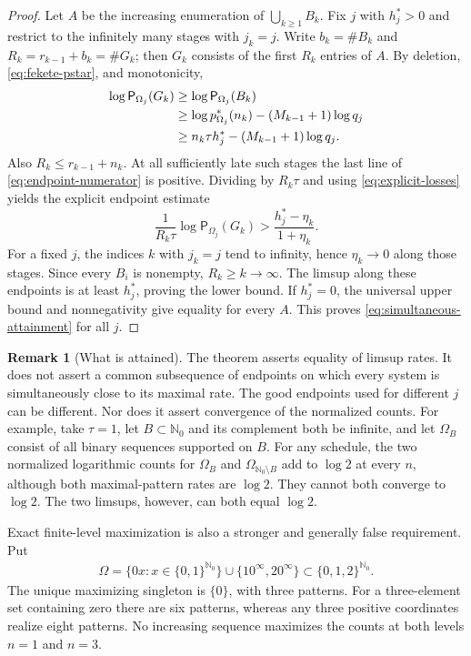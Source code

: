 \documentclass[11pt,reqno]{amsart}
\numberwithin{equation}{section}
\theoremstyle{definition}
\newtheorem{remark}[theorem]{Remark}
\theoremstyle{definition}
\newcommand{\Nzero}{\mathbb N_0}
\newcommand{\Patt}{\mathsf P}
\begin{document}
\begin{proof}
Let $A$ be the increasing enumeration of $\bigcup_{k\ge1}B_k$.  Fix $j$
with $h_j^*>0$ and restrict to the infinitely many stages with $j_k=j$.
Write $b_k=\#B_k$ and $R_k=r_{k-1}+b_k=\#G_k$; then $G_k$ consists of the
first $R_k$ entries of $A$.  By deletion, \eqref{eq:fekete-pstar}, and
monotonicity,
\begin{align}
 \log\Patt_{\Omega_j}(G_k)
 &\ge \log\Patt_{\Omega_j}(B_k)\notag\\
 &\ge \log p_{\Omega_j}^*(n_k)-(M_{k-1}+1)\log q_j\notag\\
 &\ge n_k\tau h_j^*-(M_{k-1}+1)\log q_j.
 \label{eq:endpoint-numerator}
\end{align}
Also $R_k\le r_{k-1}+n_k$.  At all sufficiently late such stages the last
line of \eqref{eq:endpoint-numerator} is positive.  Dividing by $R_k\tau$
and using \eqref{eq:explicit-losses} yields the explicit endpoint estimate
\begin{equation}\label{eq:endpoint-bound}
 \frac1{R_k\tau}\log\Patt_{\Omega_j}(G_k)
 >\frac{h_j^*-\eta_k}{1+\eta_k}.
\end{equation}
For a fixed $j$, the indices $k$ with $j_k=j$ tend to infinity, hence
$\eta_k\to0$ along those stages. Since every $B_i$ is nonempty,
$R_k\ge k\to\infty$. The limsup along these
endpoints is at least $h_j^*$, proving the lower
bound.  If $h_j^*=0$, the universal upper bound and nonnegativity give
equality for every $A$.  This proves \eqref{eq:simultaneous-attainment} for
all $j$.
\end{proof}

\begin{remark}[What is attained]\label{rem:attainment}
The theorem asserts equality of limsup rates. It does not assert a common
subsequence of endpoints on which every system is simultaneously close
to its maximal rate. The good endpoints used for different $j$ can be
different. Nor does it assert convergence of the normalized counts.
For example, take $\tau=1$, let $B\subset\Nzero$ and its complement both be infinite,
and let $\Omega_B$ consist of all binary sequences supported on $B$.
For any schedule, the two normalized logarithmic counts for $\Omega_B$
and $\Omega_{\Nzero\setminus B}$ add to $\log2$ at every $n$, although
both maximal-pattern rates are $\log2$. They cannot both converge to
$\log2$. The two limsups, however, can both equal $\log2$.

Exact finite-level maximization is also a stronger and generally false
requirement. Put
\begin{align*}
 \Omega=\{0x:x\in\{0,1\}^{\Nzero}\}\cup\{10^\infty,20^\infty\}
 \subset\{0,1,2\}^{\Nzero}.
\end{align*}
The unique maximizing singleton is $\{0\}$, with three patterns.
For a three-element set containing zero there are six patterns, whereas
any three positive coordinates realize eight patterns. No increasing
sequence maximizes the counts at both levels $n=1$ and $n=3$.
\end{remark}
\end{document}
